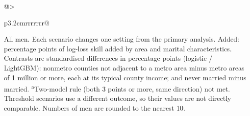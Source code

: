 \begin{table}[H]
\begin{tabular}{@{}>{\raggedright\arraybackslash}p{3.2cm}rrrrrrr@{}}
\bottomrule
\end{tabular}
\par\smallskip
\begin{minipage}{\linewidth}\scriptsize All men. Each scenario changes one setting from the primary analysis. Added: percentage points of log-loss skill added by area and marital characteristics. Contrasts are standardised differences in percentage points (logistic / LightGBM): nonmetro counties not adjacent to a metro area minus metro areas of 1 million or more, each at its typical county income; and never married minus married. \textsuperscript{a}Two-model rule (both 3 points or more, same direction) not met. Threshold scenarios use a different outcome, so their values are not directly comparable. Numbers of men are rounded to the nearest 10.\end{minipage}
\end{table}
